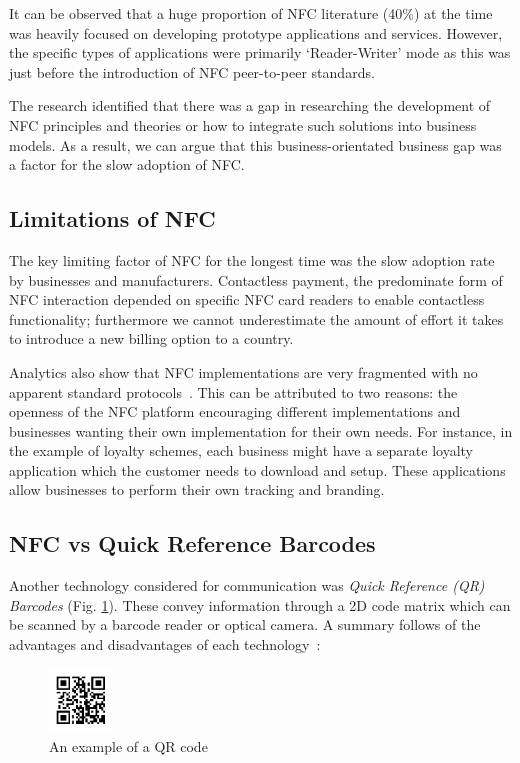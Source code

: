 It can be observed that a huge proportion of NFC literature (40\%) at the time was heavily focused on developing prototype applications and services. However, the specific types of applications were primarily `Reader-Writer' mode as this was just before the introduction of NFC peer-to-peer standards.

The research identified that there was a gap in researching the development of NFC principles and theories or how to integrate such solutions into business models. As a result, we can argue that this business-orientated business gap was a factor for the slow adoption of NFC.
\subsection{Limitations of NFC}
The key limiting factor of NFC for the longest time was the slow adoption rate by businesses and manufacturers. Contactless payment, the predominate form of NFC interaction depended on specific NFC card readers to enable contactless functionality; furthermore we cannot underestimate the amount of effort it takes to introduce a new billing option to a country.

Analytics also show that NFC implementations are very fragmented with no apparent standard protocols~\cite{fragmentednfc}. This can be attributed to two reasons: the openness of the NFC platform encouraging different implementations and businesses wanting their own implementation for their own needs. For instance, in the example of loyalty schemes, each business might have a separate loyalty application which the customer needs to download and setup. These applications allow businesses to perform their own tracking and branding.
\newpage
\subsection{NFC vs Quick Reference Barcodes}
\label{sec:NFCvsQR}
Another technology considered for communication was \emph{Quick Reference (QR) Barcodes} (Fig. \ref{fig:qrcode}). These convey information through a 2D code matrix which can be scanned by a barcode reader or optical camera. A summary follows of the advantages and disadvantages of each technology~\cite{nfcadv}\cite{qradv}:

\begin{figure}[H]
  \centering
    \includegraphics[width=0.15\textwidth]{img/qrcode.png}
      \caption{An example of a QR code}
       \label{fig:qrcode}
\end{figure}



